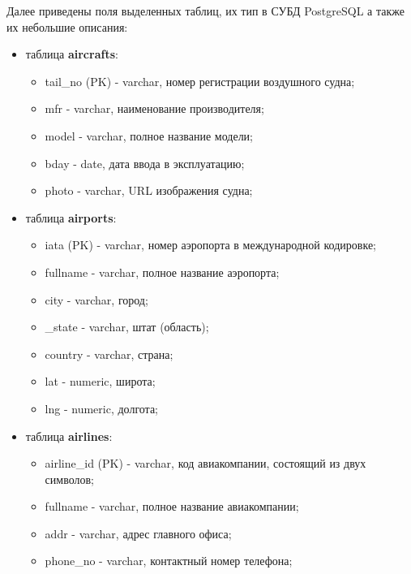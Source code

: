 

Далее приведены поля выделенных таблиц, их тип в СУБД PostgreSQL \cite{postgres} а также их небольшие описания:
\begin{itemize}
	\item таблица \textbf{aircrafts}:
	\begin{itemize}
		\item tail\_no (PK) - varchar, номер регистрации воздушного судна;
		\item mfr - varchar, наименование производителя;
		\item model - varchar, полное название модели;
		\item bday - date, дата ввода в эксплуатацию;
		\item photo - varchar, URL изображения судна;
	\end{itemize}
	
	\item таблица \textbf{airports}:
	\begin{itemize}
		\item iata (PK) - varchar, номер аэропорта в международной кодировке;
		\item fullname - varchar, полное название аэропорта;
		\item city - varchar, город;
		\item \_state - varchar, штат (область);
		\item country - varchar, страна;
		\item lat - numeric, широта;
		\item lng - numeric, долгота;
	\end{itemize}
	
	\item таблица \textbf{airlines}:
	\begin{itemize}
		\item airline\_id (PK) - varchar, код авиакомпании, состоящий из двух символов;
		\item fullname - varchar, полное название авиакомпании;
		\item addr - varchar, адрес главного офиса;
		\item phone\_no - varchar, контактный номер телефона;
	\end{itemize}
	

\end{itemize}

